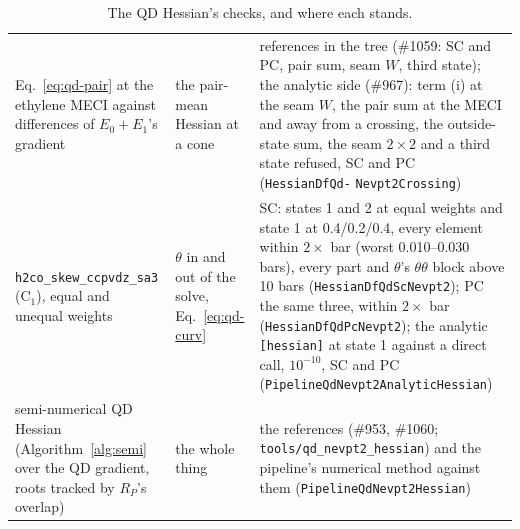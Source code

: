 \documentclass[11pt]{article}
\newcommand{\code}[1]{\texttt{#1}}
\begin{document}
\begin{table}[htbp]
\begin{tabularx}{\linewidth}{@{}>{\raggedright\arraybackslash}p{}>{\raggedright\arraybackslash}p{}>{\raggedright\arraybackslash}X@{}}
Eq.~\eqref{eq:qd-pair} at the ethylene MECI against differences of $E_0 + E_1$'s gradient & the pair-mean Hessian at a cone & references in the tree (\#1059: SC and PC, pair sum, seam $W$, third state); the analytic side (\#967): term (i) at the seam $W$, the pair sum at the MECI and away from a crossing, the outside-state sum, the seam $2\times2$ and a third state refused, SC and PC (\code{HessianDfQd-} \code{Nevpt2Crossing}) \\
\code{h2co\_skew\_ccpvdz\_sa3} (C$_1$), equal and unequal weights & $\theta$ in and out of the solve, Eq.~\eqref{eq:qd-curv} & SC: states 1 and 2 at equal weights and state 1 at 0.4/0.2/0.4, every element within $2\times$ bar (worst 0.010--0.030 bars), every part and $\theta$'s $\theta\theta$ block above 10 bars (\code{HessianDfQdScNevpt2}); PC the same three, within $2\times$ bar (\code{HessianDfQdPcNevpt2}); the analytic \code{[hessian]} at state 1 against a direct call, $10^{-10}$, SC and PC (\code{PipelineQdNevpt2AnalyticHessian}) \\
semi-numerical QD Hessian (Algorithm~\ref{alg:semi} over the QD gradient, roots tracked by $R_P$'s overlap) & the whole thing & the references (\#953, \#1060; \code{tools/qd\_nevpt2\_hessian}) and the pipeline's numerical method against them (\code{PipelineQdNevpt2Hessian}) \\
\bottomrule
\end{tabularx}
\caption{The QD Hessian's checks, and where each stands.}
\label{tab:qdhesschecks}
\end{table}
\end{document}
